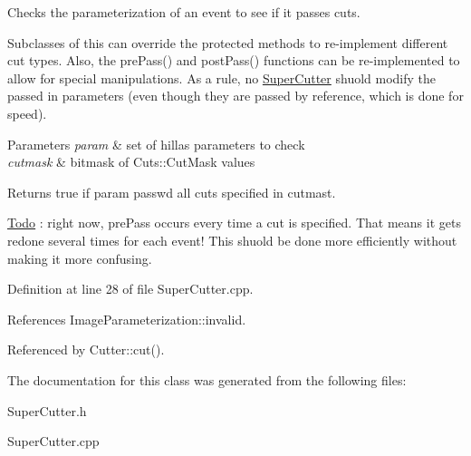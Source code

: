 Checks the parameterization of an event to see if it passes cuts. 

Subclasses of this can override the protected methods to re-\/implement different cut types. Also, the prePass() and postPass() functions can be re-\/implemented to allow for special manipulations. As a rule, no \hyperlink{classSuperCutter}{SuperCutter} shuold modify the passed in parameters (even though they are passed by reference, which is done for speed).


\begin{DoxyParams}{Parameters}
{\em param} & set of hillas parameters to check \\
\hline
{\em cutmask} & bitmask of Cuts::CutMask values \\
\hline
\end{DoxyParams}
\begin{DoxyReturn}{Returns}
true if param passwd all cuts specified in cutmast.
\end{DoxyReturn}
\begin{Desc}
\item[\hyperlink{todo__todo000033}{Todo}]: right now, prePass occurs every time a cut is specified. That means it gets redone several times for each event! This shuold be done more efficiently without making it more confusing. \end{Desc}


Definition at line 28 of file SuperCutter.cpp.



References ImageParameterization::invalid.



Referenced by Cutter::cut().



The documentation for this class was generated from the following files:\begin{DoxyCompactItemize}
\item 
SuperCutter.h\item 
SuperCutter.cpp\end{DoxyCompactItemize}
